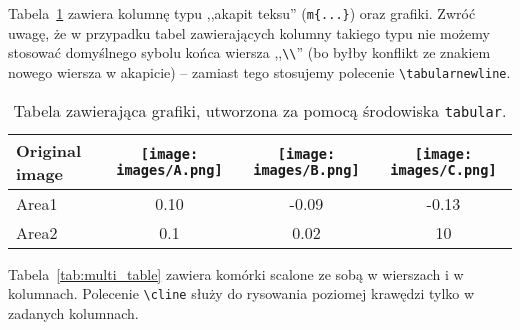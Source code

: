 \documentclass[pdftex,11pt,a4paper]{article}
\begin{document}
Tabela~\ref{tab:table_with_graphics} zawiera kolumnę typu ,,akapit teksu'' (\lstinline|m{...}|) oraz grafiki. Zwróć uwagę, że w przypadku tabel zawierających kolumny takiego typu nie możemy stosować domyślnego sybolu końca wiersza ,,\lstinline|\\|'' (bo byłby konflikt ze znakiem nowego wiersza w akapicie) -- zamiast tego stosujemy polecenie \lstinline|\tabularnewline|.

\begin{table}[H]
	\setlength{\imgheight}{1cm}
	
	\centering
	
	\caption{\label{tab:table_with_graphics}Tabela zawierająca grafiki, utworzona za pomocą środowiska \lstinline|tabular|.}
	
	\begin{tabular}{m{3cm} ccc}
		\toprule
		Original image &
		 \texttt{[image: images/A.png]}  &
		 \texttt{[image: images/B.png]}  &
		 \texttt{[image: images/C.png]}
		\tabularnewline
		\midrule
		Area1 & 0.10 & -0.09 & -0.13 \tabularnewline
		Area2 & 0.1 & 0.02 & 10 \tabularnewline
		\bottomrule
	\end{tabular}
	
\end{table}

\par\bigskip

Tabela~\ref{tab:multi_table} zawiera komórki scalone ze sobą w wierszach i w kolumnach. Polecenie \lstinline|\cline| służy do rysowania poziomej krawędzi tylko w zadanych kolumnach.
\end{document}
